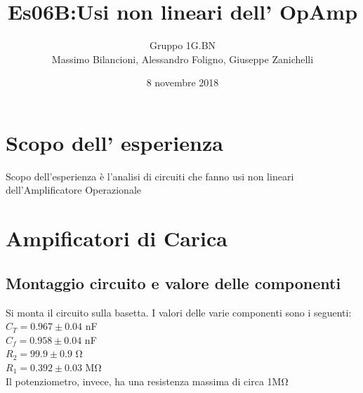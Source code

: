 \documentclass[10pt,a4paper]{article}
\author{Gruppo 1G.BN \\ Massimo Bilancioni, Alessandro Foligno, Giuseppe Zanichelli }
\title{Es06B:Usi non lineari dell’ OpAmp }
\begin{document}
	\date{8 novembre 2018}
	\maketitle
	
	
	\section*{Scopo dell' esperienza}
	Scopo dell'esperienza è l'analisi di circuiti che fanno usi non lineari dell'Amplificatore Operazionale




\section{Ampificatori di Carica}
	\subsection{Montaggio circuito e valore delle componenti}
		Si monta il circuito sulla basetta.
		I valori delle varie componenti sono i seguenti:
		\\$C_T=0.967\pm 0.04$ \si{\nano\farad}\\$C_f=0.958\pm 0.04$ \si{\nano\farad}\\$R_2=99.9\pm 0.9 $ \si{\ohm}\\$R_1=0.392 \pm0.03   $ \si{\mega \ohm}\\
				Il potenziometro, invece, ha una resistenza massima di circa 1\si{\mega\ohm}
\end{document}
